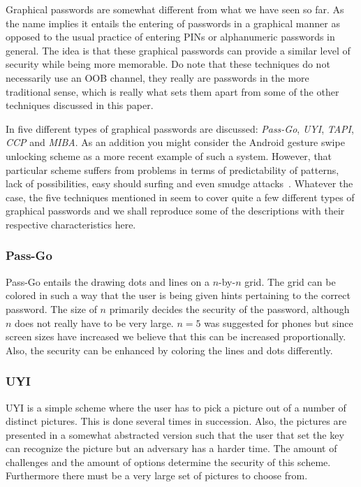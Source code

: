 \documentclass[conference, 11pt]{sty/IEEEtran}
\begin{document}
Graphical passwords are somewhat different from what we have seen so far.
As the name implies it entails the entering of passwords in a graphical manner as opposed to the usual practice of entering PINs or alphanumeric passwords in general.
The idea is that these graphical passwords can provide a similar level of security while being more memorable.
Do note that these techniques do not necessarily use an OOB channel, they really are passwords in the more traditional sense, which is really what sets them apart from some of the other techniques discussed in this paper.

In \cite{gajos2006exploring} five different types of graphical passwords are discussed: \emph{Pass-Go}, \emph{UYI}, \emph{TAPI}, \emph{CCP} and \emph{MIBA}.
As an addition you might consider the Android gesture swipe unlocking scheme as a more recent example of such a system.
However, that particular scheme suffers from problems in terms of predictability of patterns, lack of possibilities, easy should surfing and even smudge attacks~\cite{aviv2010smudge}.
Whatever the case, the five techniques mentioned in \cite{gajos2006exploring} seem to cover quite a few different types of graphical passwords and we shall reproduce some of the descriptions with their respective characteristics here.

\subsubsection{Pass-Go}
\label{sssec:pass_go}

Pass-Go entails the drawing dots and lines on a $n$-by-$n$ grid.
The grid can be colored in such a way that the user is being given hints pertaining to the correct password.
The size of $n$ primarily decides the security of the password, although $n$ does not really have to be very large.
$n = 5$ was suggested for phones but since screen sizes have increased we believe that this can be increased proportionally.
Also, the security can be enhanced by coloring the lines and dots differently.

\subsubsection{UYI}
\label{sssec:uyi}

UYI is a simple scheme where the user has to pick a picture out of a number of distinct pictures.
This is done several times in succession.
Also, the pictures are presented in a somewhat abstracted version such that the user that set the key can recognize the picture but an adversary has a harder time.
The amount of challenges and the amount of options determine the security of this scheme.
Furthermore there must be a very large set of pictures to choose from.
\end{document}
